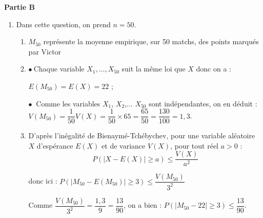 \medskip

\textbf{Partie B}

\medskip

%
%
%
%
%
%
%
%

\begin{enumerate}
\item Dans cette question, on prend $n = 50$.

	\begin{enumerate}
		\item %
$M_{50}$ représente la moyenne empirique, sur 50 matchs, des points marqués par Victor
		\item %
$\bullet~$Chaque variable $X_1,\ldots, X_{50}$ suit la même loi que $X$ donc on a :

{$E(M_{50}) = E (X) = 22$ ;}

$\bullet~$ Comme les variables $X_1$, $X_2$,... $X_50$ sont indépendantes, on en déduit : \quad $V(M_{50}) = \dfrac{1}{50}V(X) = \dfrac{1}{50} \times 65 = \dfrac{65}{50} = \dfrac{130}{100} = 1,3$.

		\item %
D'après l'inégalité de Bienaymé-Tchébychev, pour une variable aléatoire $X$  d’espérance $E(X)$ et de variance $V (X)$,  pour tout réel $a > 0$ :
		$$P(|X - E(X)|\geqslant a) \leqslant \dfrac{V(X)}{a^2}$$

donc  ici  : $P(|M_{50} - E(M_{50})| \geqslant 3) \leqslant \dfrac{V(M_{50})}{3^2}$



Comme $\dfrac{V(M_{50})}{3^2} = \dfrac{1,3}{9} = \dfrac{13}{90}$, on a bien  :  $P\left(\left|M_{50}- 22\right| \geqslant 3\right) \leqslant \dfrac{13}{90}$.




\end{enumerate}
\end{enumerate}
